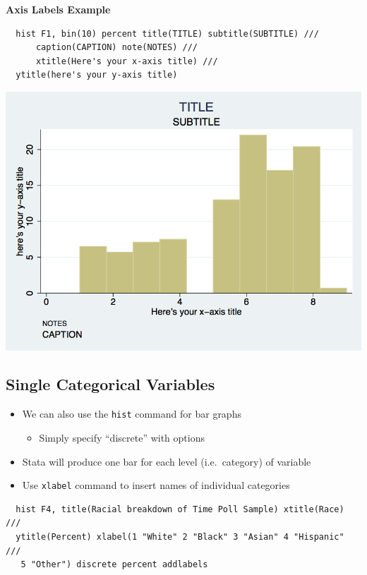 \documentclass[]{book}
\providecommand{\tightlist}{%
  \setlength{\itemsep}{0pt}\setlength{\parskip}{0pt}}
\begin{document}
\textbf{Axis Labels Example}

\begin{verbatim}
  hist F1, bin(10) percent title(TITLE) subtitle(SUBTITLE) ///
      caption(CAPTION) note(NOTES) ///
      xtitle(Here's your x-axis title) ///
  ytitle(here's your y-axis title)
\end{verbatim}

\includegraphics{Stata/StataModGraph/images/hist2.png}

\hypertarget{single-categorical-variables}{%
\subsection{Single Categorical Variables}\label{single-categorical-variables}}

\begin{itemize}
\tightlist
\item
  We can also use the \texttt{hist} command for bar graphs

  \begin{itemize}
  \tightlist
  \item
    Simply specify ``discrete'' with options
  \end{itemize}
\item
  Stata will produce one bar for each level (i.e.~category) of variable
\item
  Use \texttt{xlabel} command to insert names of individual categories
\end{itemize}

\begin{verbatim}
  hist F4, title(Racial breakdown of Time Poll Sample) xtitle(Race) ///
  ytitle(Percent) xlabel(1 "White" 2 "Black" 3 "Asian" 4 "Hispanic" ///
   5 "Other") discrete percent addlabels
\end{verbatim}
\end{document}
